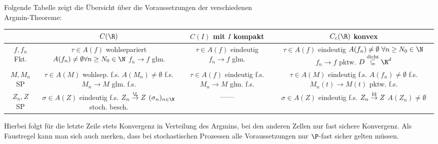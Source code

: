 
Folgende Tabelle zeigt die Übersicht über die Voraussetzungen der verschiedenen\\ Argmin-Theoreme:\nl
\begin{tabular}{c|c|c|c}
	& $C(\R)$ & $C(I)$ mit $I$ kompakt & $C_c(\R)$ konvex \\
	\hline
		\makecell{$f,f_n$\\ Fkt.} &
		\makecell{$\tau\in A(f)$ wohlsepariert\\ $A(f_n)\neq\emptyset\forall n\geq N_0\in\N$\\ $f_n\to f$ glm.} &
		\makecell{$\tau\in A(f)$ eindeutig\\ $f_n\to f$ glm.} &
		\makecell{$\tau\in A(f)$ eindeutig\\ $A(f_n)\neq\emptyset~\forall n\geq N_0\in\N$\\ $f_n\to f$ pktw. $D\overset{\text{dicht}}{\subseteq}\R^d$}\\
	\hline
		\makecell{$M,M_n$\\ SP} &
		\makecell{$\tau\in A(M)$ wohlsep. f.s.\\ $A(M_n)\neq\emptyset$ f.s. \\ $M_n\to M$ glm. f.s.} &
		\makecell{$\tau\in A(f)$ eindeutig f.s.\\ $M_n\to M$ glm. f.s.} &
		\makecell{$\tau\in A(M)$ eindeutig f.s.\\ $A(f_n)\neq\emptyset$ f.s.\\ $M_n(t)\to M(t)$ pktw. f.s.}\\
	\hline
		\makecell{$Z_n,Z$\\ SP} &
		\makecell{$\sigma\in A(Z)$ eindeutig f.s.\\ $Z_n\overset{\L}{\to}Z$\\ $(\sigma_n)_{n\in\N}$ stoch. besch.} &
		------ &
		\makecell{$\sigma\in A(Z)$ eindeutig f.s.\\ $Z_n\overset{\text{fd}}{\to}Z$ \\ $A(Z_n)\neq\emptyset$}\\
	\end{tabular}\nl
	Hierbei folgt für die letzte Zeile stets Konvergenz in Verteilung des Argmins, bei den anderen Zellen nur fast sichere Konvergenz.
	Als Faustregel kann man sich auch merken, dass bei stochastischen Prozessen alle Voraussetzungen nur $\P$-fast sicher gelten müssen.
